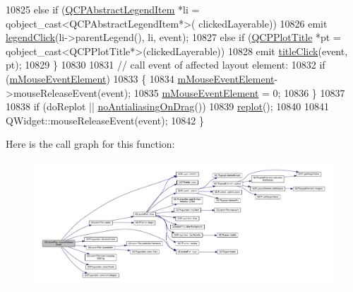 \begin{DoxyCode}
10825     \textcolor{keywordflow}{else} \textcolor{keywordflow}{if} (\hyperlink{class_q_c_p_abstract_legend_item}{QCPAbstractLegendItem} *li = qobject\_cast<QCPAbstractLegendItem*>(
      clickedLayerable))
10826       emit \hyperlink{class_q_custom_plot_a79cff0baafbca10a3aaf694d2d3b9ab3}{legendClick}(li->parentLegend(), li, event);
10827     \textcolor{keywordflow}{else} \textcolor{keywordflow}{if} (\hyperlink{class_q_c_p_plot_title}{QCPPlotTitle} *pt = qobject\_cast<QCPPlotTitle*>(clickedLayerable))
10828       emit \hyperlink{class_q_custom_plot_a2137a819e518fee7edd1c0bf5984d8d6}{titleClick}(event, pt);
10829   \}
10830   
10831   \textcolor{comment}{// call event of affected layout element:}
10832   \textcolor{keywordflow}{if} (\hyperlink{class_q_custom_plot_a2f2e8b25e59cf3cf7b15e4767c02e747}{mMouseEventElement})
10833   \{
10834     \hyperlink{class_q_custom_plot_a2f2e8b25e59cf3cf7b15e4767c02e747}{mMouseEventElement}->mouseReleaseEvent(event);
10835     \hyperlink{class_q_custom_plot_a2f2e8b25e59cf3cf7b15e4767c02e747}{mMouseEventElement} = 0;
10836   \}
10837   
10838   \textcolor{keywordflow}{if} (doReplot || \hyperlink{class_q_custom_plot_ae07f2895a34d13a97a10cae4d8e17a36}{noAntialiasingOnDrag}())
10839     \hyperlink{class_q_custom_plot_a606fd384b2a637ce2c24899bcbde77d6}{replot}();
10840   
10841   QWidget::mouseReleaseEvent(event);
10842 \}
\end{DoxyCode}


Here is the call graph for this function\+:\nopagebreak
\begin{figure}[H]
\begin{center}
\leavevmode
\includegraphics[width=350pt]{class_q_custom_plot_a724e97d2e8c03e68adac5f4b6164a1b3_cgraph}
\end{center}
\end{figure}


\hypertarget{class_q_custom_plot_ac80a14206f99304a91d2aa55775ec3ff}{}
